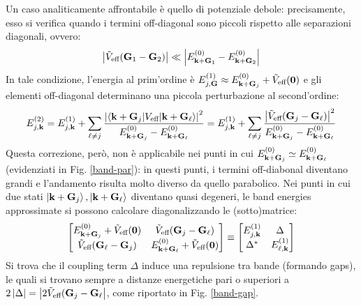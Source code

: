 Un caso analiticamente affrontabile è quello di potenziale debole: precisamente, esso si verifica quando i termini off-diagonal sono piccoli rispetto alle separazioni diagonali, ovvero:
\begin{equation}
	\left\lvert\tilde{V}_\text{eff}(\mathbf{G}_1 - \mathbf{G}_2)\right\rvert \ll \left\lvert E_{\mathbf{k} + \mathbf{G}_1}^{(0)} - E_{\mathbf{k} + \mathbf{G}_2}^{(0)}\right\rvert
\end{equation}
In tale condizione, l'energia al prim'ordine è $ E_{j,\mathbf{G}}^{(1)} \approx E_{\mathbf{k} + \mathbf{G}_j}^{(0)} + \tilde{V}_\text{eff}(\mathbf{0}) $ e gli elementi off-diagonal determinano una piccola perturbazione al second'ordine:
\begin{equation}
	E_{j,\mathbf{k}}^{(2)} = E_{j,\mathbf{k}}^{(1)} + \sum_{\ell \neq j} \frac{\left\lvert\braket{\mathbf{k} + \mathbf{G}_j | V_\text{eff} | \mathbf{k} + \mathbf{G}_\ell}\right\rvert^2}{E_{\mathbf{k} + \mathbf{G}_j}^{(0)} - E_{\mathbf{k} + \mathbf{G}_\ell}^{(0)}} = E_{j,\mathbf{k}}^{(1)} + \sum_{\ell \neq j} \frac{\left\lvert\tilde{V}_\text{eff}(\mathbf{G}_j - \mathbf{G}_\ell)\right\rvert^2}{E_{\mathbf{k} + \mathbf{G}_j}^{(0)} - E_{\mathbf{k} + \mathbf{G}_\ell}^{(0)}}
\end{equation}
Questa correzione, però, non è applicabile nei punti in cui $ E_{\mathbf{k} + \mathbf{G}_j}^{(0)} \simeq E_{\mathbf{k} + \mathbf{G}_\ell}^{(0)} $ (evidenziati in Fig. \ref{band-par}): in questi punti, i termini off-diabonal diventano grandi e l'andamento risulta molto diverso da quello parabolico. Nei punti in cui due stati $ \ket{\mathbf{k} + \mathbf{G}_j} , \ket{\mathbf{k} + \mathbf{G}_\ell} $ diventano quasi degeneri, le band energies approssimate si possono calcolare diagonalizzando le (sotto)matrice:
\begin{equation*}
	\begin{bmatrix}
		E_{\mathbf{k} + \mathbf{G}_j}^{(0)} + \tilde{V}_\text{eff}(\mathbf{0}) & \tilde{V}_\text{eff}(\mathbf{G}_j - \mathbf{G}_\ell) \\
		\tilde{V}_\text{eff}(\mathbf{G}_\ell - \mathbf{G}_j) & E_{\mathbf{k} + \mathbf{G}_\ell}^{(0)} + \tilde{V}_\text{eff}(\mathbf{0})
	\end{bmatrix}
	\equiv
	\begin{bmatrix}
		E_{j,\mathbf{k}}^{(1)} & \Delta \\
		\Delta^* & E_{\ell,\mathbf{k}}^{(1)}
	\end{bmatrix}
\end{equation*}
Si trova che il coupling term $ \Delta $ induce una repulsione tra bande (formando gaps), le quali si trovano sempre a distanze energetiche pari o superiori a $ 2\left\lvert\Delta\right\rvert = \left\lvert2\tilde{V}_\text{eff}(\mathbf{G}_j - \mathbf{G}_\ell\right\rvert $, come riportato in Fig. \ref{band-gap}.

